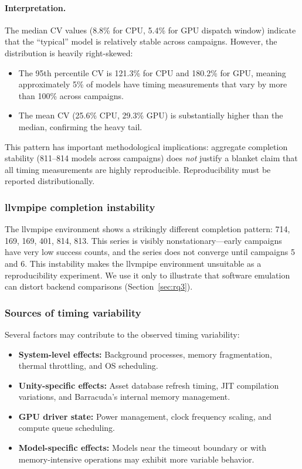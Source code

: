 \documentclass[10pt,twocolumn]{article}
\begin{document}
\paragraph{Interpretation.}
The median CV values (8.8\% for CPU, 5.4\% for GPU dispatch window) indicate that the ``typical'' model is relatively stable across campaigns. However, the distribution is heavily right-skewed:
\begin{itemize}[nosep,leftmargin=*]
  \item The 95th percentile CV is 121.3\% for CPU and 180.2\% for GPU, meaning approximately 5\% of models have timing measurements that vary by more than 100\% across campaigns.
  \item The mean CV (25.6\% CPU, 29.3\% GPU) is substantially higher than the median, confirming the heavy tail.
\end{itemize}

This pattern has important methodological implications: aggregate completion stability (811--814 models across campaigns) does \emph{not} justify a blanket claim that all timing measurements are highly reproducible. Reproducibility must be reported distributionally.

\ReproducibilityFigure

\subsubsection{llvmpipe completion instability}

The llvmpipe environment shows a strikingly different completion pattern: 714, 169, 169, 401, 814, 813. This series is visibly nonstationary---early campaigns have very low success counts, and the series does not converge until campaigns 5 and 6. This instability makes the llvmpipe environment unsuitable as a reproducibility experiment. We use it only to illustrate that software emulation can distort backend comparisons (Section~\ref{sec:rq3}).

\subsubsection{Sources of timing variability}

Several factors may contribute to the observed timing variability:
\begin{itemize}[nosep,leftmargin=*]
  \item \textbf{System-level effects:} Background processes, memory fragmentation, thermal throttling, and OS scheduling.
  \item \textbf{Unity-specific effects:} Asset database refresh timing, JIT compilation variations, and Barracuda's internal memory management.
  \item \textbf{GPU driver state:} Power management, clock frequency scaling, and compute queue scheduling.
  \item \textbf{Model-specific effects:} Models near the timeout boundary or with memory-intensive operations may exhibit more variable behavior.
\end{itemize}
\end{document}

